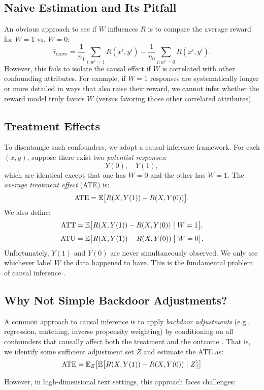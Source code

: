 \subsection{Naive Estimation and Its Pitfall}
An obvious approach to see if $W$ influences $R$ is to compare the average reward for $W=1$ vs. $W=0$:
\[
\hat{\tau}_{\text{naive}}
= \frac{1}{n_1}\sum_{i: w^{i}=1} R(x^i, y^{i})
- \frac{1}{n_0}\sum_{i: w^{i}=0} R(x^i, y^{i}).
\]
However, this fails to isolate the causal effect if $W$ is correlated with other confounding attributes. For example, if $W=1$ responses are systematically longer or more detailed in ways that also raise their reward, we cannot infer whether the reward model truly favors $W$ (versus favoring those other correlated attributes).

\subsection{Treatment Effects}
To disentangle such confounders, we adopt a causal-inference framework. For each $(x, y)$, suppose there exist two \emph{potential responses}:
\[
Y(0), \quad Y(1),
\]
which are identical except that one has $W=0$ and the other has $W=1$. The \emph{average treatment effect} (ATE) is:
\[
\text{ATE}
= \mathbb{E}\bigl[R(X, Y(1)) - R(X, Y(0))\bigr].
\]
We also define:
\[
\text{ATT} = \mathbb{E}\bigl[R(X, Y(1)) - R(X, Y(0)) \;\big|\; W=1\bigr],
\]
\[
\text{ATU} = \mathbb{E}\bigl[R(X, Y(1)) - R(X, Y(0)) \;\big|\; W=0\bigr].
\]
Unfortunately, $Y(1)$ and $Y(0)$ are never simultaneously observed. We only see whichever label $W$ the data happened to have. This is the fundamental problem of causal inference \cite{imbens2015causal}.

\subsection{Why Not Simple Backdoor Adjustments?}
\label{sec:why_not_backdoor}
A common approach to causal inference is to apply \emph{backdoor adjustments} (e.g., regression, matching, inverse propensity weighting) by conditioning on all confounders that causally affect both the treatment and the outcome \cite{cinelli2024crash}. That is, we identify some sufficient adjustment set $Z$ and estimate the ATE as:
\[
\text{ATE} = \mathbb{E}_Z\bigl[\mathbb{E}\bigl[R(X, Y(1)) - R(X, Y(0)) \;\big|\; Z\bigr]\bigr]
\]

However, in high-dimensional text settings, this approach faces challenges:

